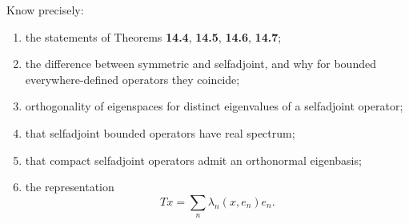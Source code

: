 \documentclass[header={Lecture 11 Exam Study Notes}]{study-note}
\begin{document}
\begin{focusbox}
Know precisely:
\begin{enumerate}
\item the statements of Theorems \textbf{14.4}, \textbf{14.5}, \textbf{14.6}, \textbf{14.7};
\item the difference between symmetric and selfadjoint, and why for bounded everywhere-defined operators they coincide;
\item orthogonality of eigenspaces for distinct eigenvalues of a selfadjoint operator;
\item that selfadjoint bounded operators have real spectrum;
\item that compact selfadjoint operators admit an orthonormal eigenbasis;
\item the representation
\[
Tx=\sum_n \lambda_n(x,e_n)e_n.
\]
\end{enumerate}
\end{focusbox}
\end{document}
